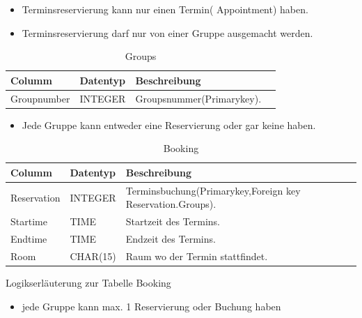 \documentclass[10pt,a4paper]{article}
\begin{document}
\begin{itemize} 
\item Terminsreservierung kann nur einen Termin( Appointment) haben.
\item Terminsreservierung darf nur von einer Gruppe ausgemacht werden.
\end{itemize}
\begin{table}[h]
\centering
\caption{Groups}
    \begin{tabular}{| l | l | l | l |}
    \hline
    \rowcolor{lightgray} Columm & Datentyp & Beschreibung  \\ \hline
    Groupnumber & INTEGER & Groupsnummer(Primarykey).  \\ \hline
   \end{tabular}
\end{table}

\begin{itemize}
\item Jede Gruppe kann entweder eine Reservierung oder gar keine haben. 

\end{itemize}


\begin{table}[h]
\centering
\caption{Booking}
    \begin{tabular}{| l | l | l | l |}
    \hline
    \rowcolor{lightgray} Columm & Datentyp & Beschreibung  \\ \hline
    Reservation  & INTEGER & Terminsbuchung(Primarykey,Foreign key Reservation.Groups). \\ \hline
    Startime & TIME & Startzeit des Termins. \\ \hline
    Endtime & TIME & Endzeit des Termins. \\ \hline
    Room & CHAR(15) & Raum wo der Termin stattfindet. \\ \hline
    \end{tabular}
\end{table}

Logikserläuterung zur Tabelle Booking
\begin{itemize}
\item jede Gruppe kann max. 1 Reservierung oder Buchung haben 
\end{itemize}
\end{document}
